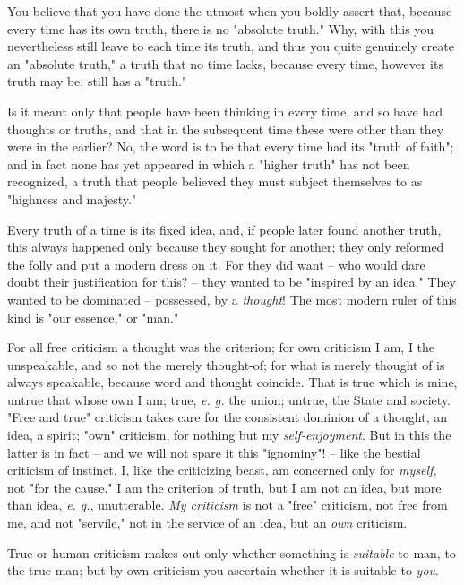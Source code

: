 You believe that you have done the utmost when you boldly assert that, because 
every time has its own truth, there is no "{}absolute truth."{} Why, with this 
you nevertheless still leave to each time its truth, and thus you quite 
genuinely create an "{}absolute truth,"{} a truth that no time lacks, because 
every time, however its truth may be, still has a "{}truth."{}

Is it meant only that people have been thinking in every time, and so have had 
thoughts or truths, and that in the subsequent time these were other than they 
were in the earlier? No, the word is to be that every time had its "{}truth of 
faith"{}; and in fact none has yet appeared in which a "{}higher truth"{} has 
not been recognized, a truth that people believed they must subject themselves 
to as "{}highness and majesty."{}

Every truth of a time is its fixed idea, and, if people later found another 
truth, this always happened only because they sought for another; they only 
reformed the folly and put a modern dress on it. For they did want -- who 
would dare doubt their justification for this? -- they wanted to be 
"{}inspired by an idea."{} They wanted to be dominated -- possessed, by a 
\textit{thought}! The most modern ruler of this kind is "{}our essence,"{} or 
"{}man."{}

For all free criticism a thought was the criterion; for own criticism I am, I 
the unspeakable, and so not the merely thought-of; for what is merely thought 
of is always speakable, because word and thought coincide. That is true which 
is mine, untrue that whose own I am; true, \textit{e. g.} the union; untrue, 
the State and society. "{}Free and true"{} criticism takes care for the 
consistent dominion of a thought, an idea, a spirit; "{}own"{} criticism, for 
nothing but my \textit{self-enjoyment}. But in this the latter is in fact -- 
and we will not spare it this "{}ignominy"{}! -- like the bestial criticism of 
instinct. I, like the criticizing beast, am concerned only for 
\textit{myself}, not "{}for the cause."{} I am the criterion of truth, but I 
am not an idea, but more than idea, \textit{e. g.}, unutterable. \textit{My 
criticism} is not a "{}free"{} criticism, not free from me, and not 
"{}servile,"{} not in the service of an idea, but an \textit{own} criticism.

True or human criticism makes out only whether something is \textit{suitable} 
to man, to the true man; but by own criticism you ascertain whether it is 
suitable to \textit{you}.


